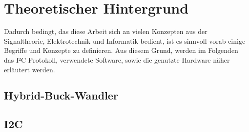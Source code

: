 \section{Theoretischer Hintergrund}
Dadurch bedingt, das diese Arbeit sich an vielen Konzepten aus der Signaltheorie, Elektrotechnik und Informatik bedient, ist es sinnvoll vorab einige Begriffe und Konzepte zu definieren. Aus diesem Grund, werden im Folgenden das I²C Protokoll, verwendete Software, sowie die genutzte Hardware näher erläutert werden. 

\subsection{Hybrid-Buck-Wandler}
\subsection{I2C}
